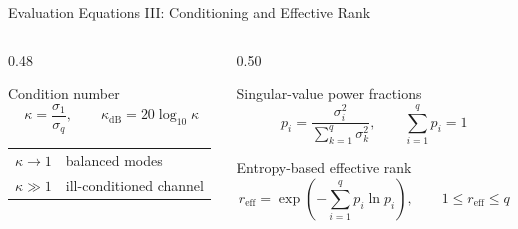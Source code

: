 \begin{frame}[t]{Evaluation Equations III: Conditioning and Effective Rank}
  \footnotesize
  \begin{columns}[T,onlytextwidth]
    \begin{column}{0.48\textwidth}
      \begin{block}{Condition number}
        \begin{equation*}
          \kappa=\frac{\sigma_1}{\sigma_q},\qquad
          \kappa_{\mathrm{dB}}=20\log_{10}\kappa
        \end{equation*}
      \end{block}

      \begin{center}
        \begin{tabular}{c@{\quad$\Longrightarrow$\quad}l}
          $\kappa\rightarrow1$ & balanced modes\\[0.5ex]
          $\kappa\gg1$ & ill-conditioned channel
        \end{tabular}
      \end{center}
    \end{column}

    \begin{column}{0.50\textwidth}
      \begin{block}{Singular-value power fractions}
        \begin{equation*}
          p_i=\frac{\sigma_i^2}{\sum_{k=1}^{q}\sigma_k^2},
          \qquad \sum_{i=1}^{q}p_i=1
        \end{equation*}
      \end{block}

      \begin{block}{Entropy-based effective rank}
        \begin{equation*}
          r_{\mathrm{eff}}
          =\operatorname{exp}\!\left(-\sum_{i=1}^{q}p_i\ln p_i\right),
          \qquad 1\leq r_{\mathrm{eff}}\leq q
        \end{equation*}
      \end{block}
    \end{column}
  \end{columns}

\end{frame}



